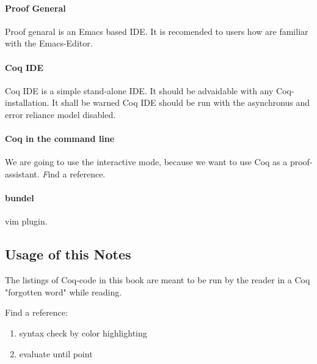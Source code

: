 \paragraph{Proof General}
Proof genaral is an \gls{Emacs} based IDE. It is recomended to users how are familiar with the Emacs-Editor.

\paragraph{Coq IDE}
Coq IDE is a simple stand-alone IDE. 
It should be advaidable with any Coq-installation. 
It shall be warned Coq IDE should be run with the asynchronus and error reliance model disabled. 

\paragraph{Coq in the command line}
We are going to use the interactive mode, because we want to use Coq as a proof-assistant. {\emph Find a reference.}

\paragraph{bundel}
vim plugin.


\subsection{Usage of this Notes}

The listings of Coq-code in this book are meant to be run by the reader in a Coq "forgotten word" while reading.

Find a reference:
\begin{enumerate}
\item syntax check by color highlighting
\item evaluate until point
\end{enumerate}




